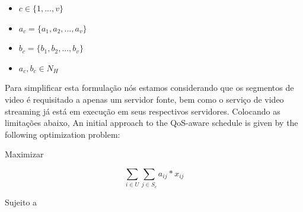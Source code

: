 \vspace{0.5cm}
\begin{itemize}

\item  $c \in \{1,...,v\}$

\item  $a_{c} = \{a_{1},a_{2},...,a_{v}\}$

\item  $b_{c} = \{b_{1},b_{2},...,b_{v}\}$

\item  $a_{c},b_{c} \in N_{H}$

\end{itemize}
\vspace{0.5cm}

%


Para simplificar esta formulação nós estamos considerando que os segmentos de video é requisitado a apenas um servidor fonte, bem como o serviço de video streaming já está em execução em seus respectivos servidores. Colocando as limitações abaixo, An initial approach to the QoS-aware schedule is given by the following optimization problem:

\vspace{0.5cm}


Maximizar

\begin{equation}\label{maximize}
\sum_{i \in U} 
\sum_{j \in S_{c}}
a_{ij} \ast x_{ij}
\end{equation}

Sujeito a

